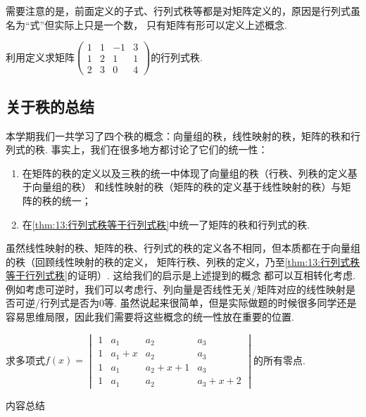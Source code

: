 需要注意的是，前面定义的子式、行列式秩等都是对矩阵定义的，原因是行列式虽名为``式''但实际上只是一个数，
只有矩阵有形可以定义上述概念.
\begin{example}
    利用定义求矩阵$\begin{pmatrix}
        1 & 1 & -1 & 3 \\ 1 & 2 & 1 & 1 \\ 2 & 3 & 0 & 4
    \end{pmatrix}$的行列式秩.
\end{example}
\begin{solution}

\end{solution}

\subsection{关于秩的总结}
本学期我们一共学习了四个秩的概念：向量组的秩，线性映射的秩，矩阵的秩和行列式的秩.
事实上，我们在很多地方都讨论了它们的统一性：
\begin{enumerate}
    \item 在矩阵的秩的定义以及三秩的统一中体现了向量组的秩（行秩、列秩的定义基于向量组的秩）
    和线性映射的秩（矩阵的秩的定义基于线性映射的秩）与矩阵的秩的统一；
    \item 在\autoref{thm:13:行列式秩等于行列式秩}中统一了矩阵的秩和行列式的秩.
\end{enumerate}
虽然线性映射的秩、矩阵的秩、行列式的秩的定义各不相同，但本质都在于向量组的秩（回顾线性映射的秩的定义，
矩阵行秩、列秩的定义，乃至\autoref{thm:13:行列式秩等于行列式秩}的证明）. 这给我们的启示是上述提到的概念
都可以互相转化考虑.例如考虑可逆时，我们可以考虑行、列向量是否线性无关/矩阵对应的线性映射是否可逆/行列式是否为0等.
虽然说起来很简单，但是实际做题的时候很多同学还是容易思维局限，因此我们需要将这些概念的统一性放在重要的位置.
\begin{example}
    求多项式$f(x)=\begin{vmatrix}
		1 & a_1 & a_2 & a_3 \\
		1 & a_1+x & a_2 & a_3 \\
		1 & a_1 & a_2+x+1 & a_3 \\
		1 & a_1 & a_2 & a_3+x+2
	\end{vmatrix}$的所有零点.
\end{example}

\vspace{2ex}
\centerline{\heiti \Large 内容总结}

\vspace{2ex}

